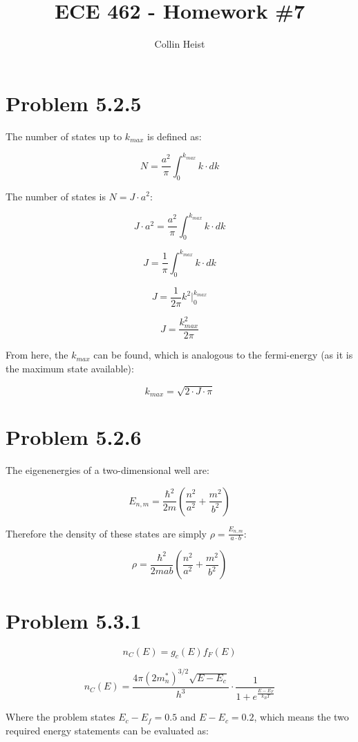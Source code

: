 \documentclass[11pt]{article}
\author{Collin Heist}
\title{ECE 462 - Homework \#7}
\begin{document}
    
    
    \maketitle

    \hypertarget{problem-5.2.5}{%
\section{Problem 5.2.5}\label{problem-5.2.5}}

The number of states up to \(k_{max}\) is defined as:

\[N=\frac{a^2}{\pi}\int_{0}^{k_{max}}k\cdot dk\]

The number of states is \(N=J\cdot a^2\):

\[J\cdot a^2=\frac{a^2}{\pi}\int_{0}^{k_{max}}k\cdot dk\]

\[J=\frac{1}{\pi}\int_{0}^{k_{max}}k\cdot dk\]

\[J=\frac{1}{2\pi}k^2|_{0}^{k_{max}}\]

\[J=\frac{k_{max}^2}{2\pi}\]

From here, the \(k_{max}\) can be found, which is analogous to the
fermi-energy (as it is the maximum state available):

\[k_{max}=\sqrt{2\cdot J\cdot \pi}\]

    \hypertarget{problem-5.2.6}{%
\section{Problem 5.2.6}\label{problem-5.2.6}}

The eigenenergies of a two-dimensional well are:

\[E_{n,m}=\frac{\hbar^2}{2m}(\frac{n^2}{a^2}+\frac{m^2}{b^2})\]

Therefore the density of these states are simply
\(\rho=\frac{E_{n,m}}{a\cdot b}\):

\[\rho=\frac{\hbar^2}{2mab}(\frac{n^2}{a^2}+\frac{m^2}{b^2})\]

    \hypertarget{problem-5.3.1}{%
\section{Problem 5.3.1}\label{problem-5.3.1}}

\[n_C(E)=g_c(E)f_F(E)\]

\[n_C(E)=\frac{4\pi (2m_n^*)^{3/2}\sqrt{E-E_c}}{h^3}\cdot \frac{1}{1+e^{\frac{E-E_F}{k_BT}}}\]

Where the problem states \(E_c-E_f=0.5\) and \(E-E_c=0.2\), which means
the two required energy statements can be evaluated as:
\end{document}
